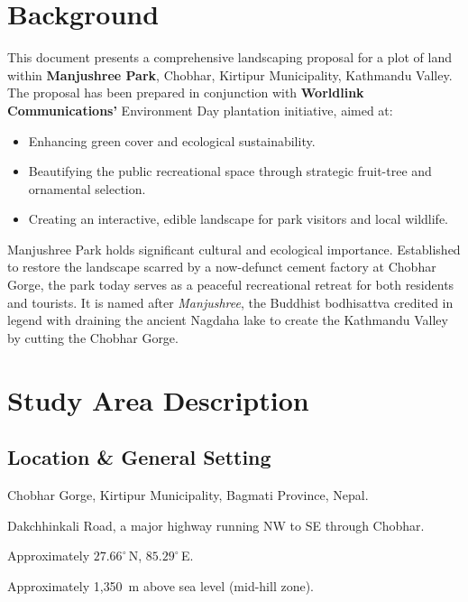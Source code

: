 \documentclass[11pt,a4paper]{article}
\begin{document}
\tableofcontents
\newpage

\section{Background}
\label{sec:background}

This document presents a comprehensive landscaping proposal for a plot of land within \textbf{Manjushree Park}, Chobhar, Kirtipur Municipality, Kathmandu Valley. The proposal has been prepared in conjunction with \textbf{Worldlink Communications'} Environment Day plantation initiative, aimed at:
\begin{itemize}
  \item Enhancing green cover and ecological sustainability.
  \item Beautifying the public recreational space through strategic fruit-tree and ornamental selection.
  \item Creating an interactive, edible landscape for park visitors and local wildlife.
\end{itemize}

Manjushree Park holds significant cultural and ecological importance. Established to restore the landscape scarred by a now-defunct cement factory at Chobhar Gorge, the park today serves as a peaceful recreational retreat for both residents and tourists. It is named after \emph{Manjushree}, the Buddhist bodhisattva credited in legend with draining the ancient Nagdaha lake to create the Kathmandu Valley by cutting the Chobhar Gorge.

\section{Study Area Description}
\label{sec:study-area}

\subsection{Location \& General Setting}
\begin{description}[leftmargin=3.2cm,style=nextline,font=\normalfont\bfseries]
  \item[Location] Chobhar Gorge, Kirtipur Municipality, Bagmati Province, Nepal.
  \item[Road Frontage] Dakchhinkali Road, a major highway running NW to SE through Chobhar.
  \item[Coordinates] Approximately $27.66^{\circ}$\,N, $85.29^{\circ}$\,E.
  \item[Altitude] Approximately 1{,}350~m above sea level (mid-hill zone).
\end{description}
\end{document}
